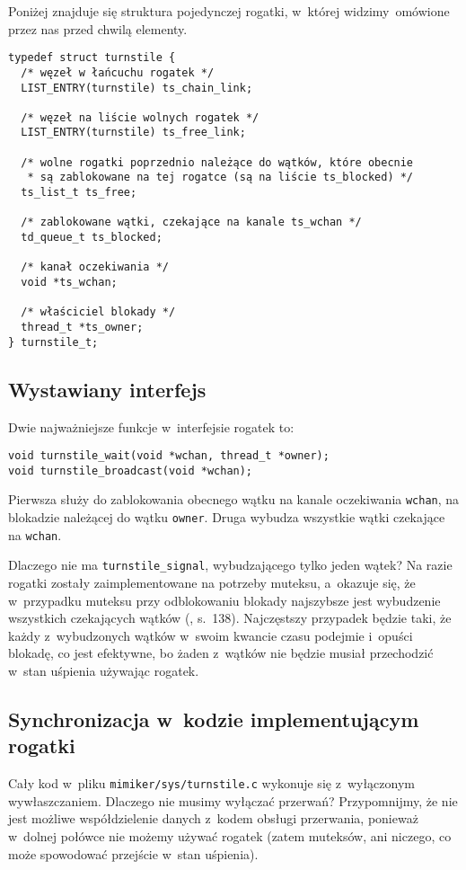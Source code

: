 \documentclass[shortabstract]{iithesis}
\theoremstyle{definition} \newtheorem*{definition}{Definicja}
\theoremstyle{definition} \newtheorem*{example}{Przykład}
\theoremstyle{definition} \newtheorem*{remark}{Uwaga}
\begin{document}
Poniżej znajduje się struktura pojedynczej rogatki, w~której widzimy omówione przez nas przed chwilą
elementy.

\begin{lstlisting}
typedef struct turnstile {
  /* węzeł w łańcuchu rogatek */
  LIST_ENTRY(turnstile) ts_chain_link;

  /* węzeł na liście wolnych rogatek */
  LIST_ENTRY(turnstile) ts_free_link;

  /* wolne rogatki poprzednio należące do wątków, które obecnie
   * są zablokowane na tej rogatce (są na liście ts_blocked) */
  ts_list_t ts_free;

  /* zablokowane wątki, czekające na kanale ts_wchan */
  td_queue_t ts_blocked;

  /* kanał oczekiwania */
  void *ts_wchan;

  /* właściciel blokady */
  thread_t *ts_owner;
} turnstile_t;
\end{lstlisting}

\subsection{Wystawiany interfejs}
Dwie najważniejsze funkcje w~interfejsie rogatek to:
\begin{lstlisting}
void turnstile_wait(void *wchan, thread_t *owner);
void turnstile_broadcast(void *wchan);
\end{lstlisting}

Pierwsza służy do zablokowania obecnego wątku na kanale oczekiwania \texttt{wchan}, na blokadzie należącej
do wątku \texttt{owner}. Druga wybudza wszystkie wątki czekające na \texttt{wchan}.

Dlaczego nie ma \texttt{turnstile\_signal}, wybudzającego tylko jeden wątek? Na razie rogatki zostały
zaimplementowane na potrzeby muteksu, a~okazuje się, że w~przypadku muteksu przy odblokowaniu blokady
najszybsze jest wybudzenie wszystkich czekających wątków (\cite{bib:freebsd}, s.~138).
Najczęstszy przypadek będzie taki, że każdy z~wybudzonych wątków w~swoim kwancie czasu podejmie i~opuści blokadę,
co jest efektywne, bo żaden z~wątków nie będzie musiał przechodzić w~stan uśpienia używając rogatek.

\subsection{Synchronizacja w~kodzie implementującym rogatki}
Cały kod w~pliku \texttt{mimiker/sys/turnstile.c} wykonuje się z~wyłączonym wywłaszczaniem.
Dlaczego nie musimy wyłączać przerwań? Przypomnijmy, że nie jest możliwe współdzielenie danych z~kodem
obsługi przerwania, ponieważ w~dolnej połówce nie możemy używać rogatek (zatem muteksów, ani niczego,
co może spowodować przejście w~stan uśpienia).
\end{document}
